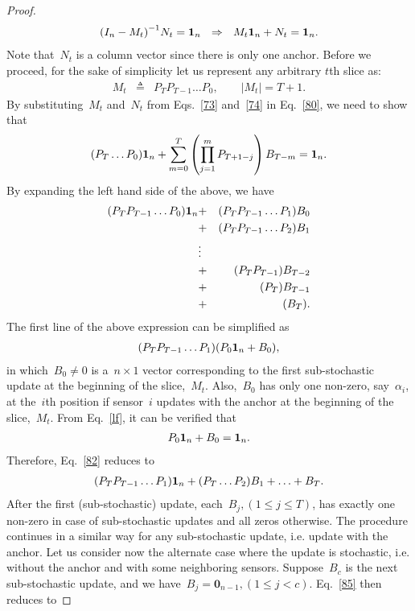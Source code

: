 \documentclass[draftclsnofoot, onecolumn, 12pt]{IEEEtran}
\def\mb{\mathbf}
\begin{document}
\begin{proof}
\begin{eqnarray}\label{80}
{(I_n-M_t)}^{-1} N_t = \mb{1}_n~~\Rightarrow~~M_t{\bf{1}}_n+N_t = {\bf{1}}_n.
\end{eqnarray}
Note that~$N_t$ is a column vector since there is only one anchor. Before we proceed, for the sake of simplicity let us represent any arbitrary $t$th slice as:
\begin{eqnarray*}
M_t &\triangleq& P_{T} P_{{T}-1} \ldots P_{0}, \qquad \vert M_t \vert =T+1.
\end{eqnarray*}
By substituting~$M_t$ and~$N_t$ from Eqs.~\eqref{73} and~\eqref{74} in Eq.~\eqref{80}, we need to show that
\begin{eqnarray}
( P_{T} \ldots P_{{0}}){\bf{1}}_n+
\sum\limits_{m=0}^{T}\left(\prod_{j=1}^m P_{T+1-j}\right)B_{T-m} ={\bf{1}}_n.
\end{eqnarray}
By expanding the left hand side of the above, we have
\begin{eqnarray}
(P_{T} P_{{T}-1}\ldots P_{{0}}){\bf{1}}_n&+&(P_{T} P_{{T}-1}\ldots P_{{1}})B_{0}\nonumber\\
&+&(P_{T} P_{{T}-1}\ldots P_{{2}})B_{1}\nonumber\\
&\vdots&\nonumber\\
&+&(P_{T} P_{{T}-1})B_{T-2}\nonumber\\
&+&(P_{T})B_{T-1}\nonumber\\
&+&(B_{T}).\label{82}
\end{eqnarray}
The first line of the above expression can be simplified as
\begin{eqnarray}\label{7-2}
(P_{T} P_{{T}-1}\ldots P_{{1}})( P_0{{\bf{1}}_n}+B_{0}),
\end{eqnarray}
in which~$B_{0} \neq 0$ is a~$n \times 1$ vector corresponding to the first sub-stochastic update at the beginning of the slice,~$M_t$. Also,~$B_{0}$ has only one non-zero, say~$\alpha_i$, at the~$i$th position if sensor~$i$ updates with the anchor at the beginning of the slice,~$M_t$. From Eq.~\eqref{lf}, it can be verified that
\begin{eqnarray}
P_{0}{\bf{1}}_n+B_{0}={\bf{1}}_n.
\end{eqnarray}
Therefore, Eq.~\eqref{82} reduces to
\begin{eqnarray}\label{85}
(P_{T} P_{{T}-1}\ldots P_{{1}}){\bf{1}}_n+(P_{T}\ldots P_{{2}})B_{{1}}+ \ldots+B_{T}.
\end{eqnarray}
After the first (sub-stochastic) update, each~$B_{j}, (1\leq j\leq T)$, has exactly one non-zero in case of sub-stochastic updates and all zeros otherwise. The procedure continues in a similar way for any sub-stochastic update, i.e. update with the anchor. Let us consider now the alternate case where the update is stochastic, i.e. without the anchor and with some neighboring sensors. Suppose~$B_{c}$ is the next sub-stochastic update, and we have~$B_{j}=\mb{0}_{n-1}, (1 \leq j < c)$. Eq.~\eqref{85} then reduces to

\end{proof}
\end{document}
